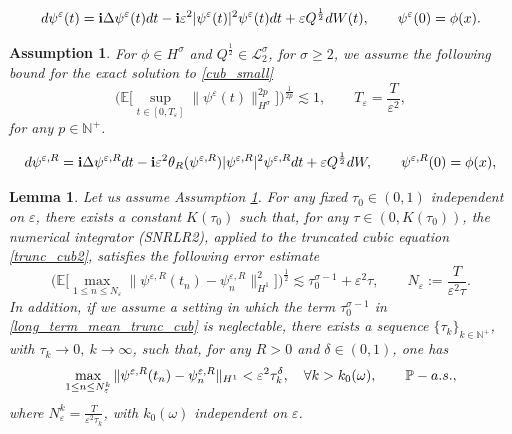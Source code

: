 \documentclass[10pt,a4paper]{amsart}
\newtheorem{assumption}{Assumption}
\newtheorem{lemma}{Lemma}
\begin{document}
\begin{equation}
    \label{cub_small}
    d\psi^\varepsilon(t)={\bf i}\Delta \psi^\varepsilon(t) dt-{\bf i}\varepsilon^2 |\psi^\varepsilon(t)|^2\psi^\varepsilon(t)dt+\varepsilon Q^{\frac{1}{2}}dW(t), \qquad \psi^\varepsilon(0)=\phi(x).
\end{equation}

\begin{assumption}
\label{smal_cub_ass}
For $\phi\in H^\sigma$ and $Q^{\frac{1}{2}}\in\mathcal{L}_2^\sigma$, for $\sigma\ge 2$, we assume the following bound for the exact solution to  \eqref{cub_small}
$$
\big(\mathbb{E}\big[\displaystyle\sup_{t\in[0,T_\varepsilon]}\|\psi^\varepsilon(t)\|^{2p}_{H^\sigma}\big]\big)^{\frac{1}{2p}}\lesssim 1, \qquad T_\varepsilon=\frac{T}{\varepsilon^2},
$$
for any $p\in\mathbb{N}^+$.
\end{assumption}

\begin{equation}
    \label{trunc_cub2}
 d\psi^{\varepsilon,R}={\bf i}\Delta \psi^{\varepsilon,R} dt-{\bf i}\varepsilon^2 \theta_R(\psi^{\varepsilon,R})|\psi^{\varepsilon,R}|^2\psi^{\varepsilon,R} dt+\varepsilon Q^{\frac{1}{2}}dW, \qquad \psi^{\varepsilon,R}(0)=\phi(x),
\end{equation}

\begin{lemma}
\label{long_term_cub_trunc}
    Let us assume Assumption \ref{smal_cub_ass}. For any fixed $\tau_0\in(0,1)$ independent on $\varepsilon$, there exists a constant $K(\tau_0)$ such that, for any $\tau\in(0,K(\tau_0))$, the numerical integrator (SNRLR2), applied to the truncated cubic equation \eqref{trunc_cub2}, satisfies the following error estimate
    \begin{equation}
        \label{long_term_mean_trunc_cub}
    \big(\mathbb{E}\big[\max_{1\le n\le N_\varepsilon}\|\psi^{\varepsilon,R}(t_n)-\psi^{\varepsilon,R}_n\|^2_{H^1}\big]\big)^{\frac{1}{2}}\lesssim\tau_0^{\sigma-1}+\varepsilon^2\tau, \qquad N_\varepsilon:=\frac{T}{\varepsilon^2 \tau}.
    \end{equation}
    In addition, if we assume a setting in which the term $\tau_0^{\sigma-1}$ in \eqref{long_term_mean_trunc_cub} is neglectable, there exists a sequence $\{\tau_k\}_{k\in\mathbb{N}^+}$, with $\tau_k\to 0, \ k\to \infty$, such that, for any $R>0$ and $\delta\in(0,1)$, one has
    \begin{equation}
        \label{long_term_path_trunc_cub}
        \max_{1\le n\le N^k_\varepsilon}\|\psi^{\varepsilon,R}(t_n)-\psi^{\varepsilon,R}_n\|_{H^1}<\varepsilon^2 \tau_k^\delta, \quad \forall k>k_0(\omega), \qquad \mathbb{P}-{\rm a.s.},
    \end{equation}
    where $N_\varepsilon^k=\frac{T}{\varepsilon^2 \tau_k}$, with $k_0(\omega)$ independent on $\varepsilon$.
\end{lemma}
\end{document}
